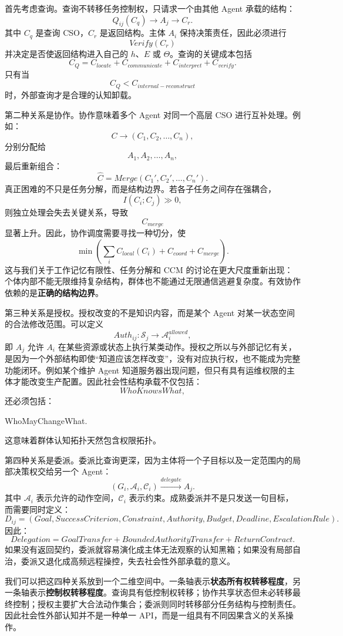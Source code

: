 首先考虑查询。查询不转移任务控制权，只请求一个由其他 Agent 承载的结构：
\[
Q_{ij}(C_q)
\rightarrow
A_j
\rightarrow
C_r.
\]
其中 $C_q$ 是查询 CSO，$C_r$ 是返回结构。主体 $A_i$ 保持决策责任，因此必须进行
\[
Verify(C_r)
\]
并决定是否使返回结构进入自己的 $h$、$E$ 或 $\Theta$。查询的关键成本包括
\[
C_Q
=
C_{locate}
+
C_{communicate}
+
C_{interpret}
+
C_{verify}.
\]
只有当
\[
C_Q<C_{internal-reconstruct}
\]
时，外部查询才是合理的认知卸载。

第二种关系是协作。协作意味着多个 Agent 对同一个高层 CSO 进行互补处理。例如：
\[
C
\rightarrow
(C_1,C_2,\ldots,C_n),
\]
分别分配给
\[
A_1,A_2,\ldots,A_n,
\]
最后重新组合：
\[
\hat C
=
Merge(C_1',C_2',\ldots,C_n').
\]
真正困难的不只是任务分解，而是结构边界。若各子任务之间存在强耦合，
\[
I(C_i;C_j)\gg0,
\]
则独立处理会失去关键关系，导致
\[
C_{merge}
\]
显著上升。因此，协作调度需要寻找一种切分，使
\[
\min
\left(
\sum_i C_{local}(C_i)
+
C_{coord}
+
C_{merge}
\right).
\]
这与我们关于工作记忆有限性、任务分解和 CCM 的讨论在更大尺度重新出现：个体内部不能无限维持复杂结构，群体也不能通过无限通信逃避复杂度。有效协作依赖的是\textbf{正确的结构边界}。

第三种关系是授权。授权改变的不是知识内容，而是某个 Agent 对某一状态空间的合法修改范围。可以定义
\[
Auth_{ij}
:
\mathcal S_j
\rightarrow
\mathcal A_i^{allowed},
\]
即 $A_j$ 允许 $A_i$ 在某些资源或状态上执行某类动作。授权之所以与外部记忆有关，是因为一个外部结构即使``知道应该怎样改变''，没有对应执行权，也不能成为完整功能闭环。例如某个维护 Agent 知道服务器出现问题，但只有具有运维权限的主体才能改变生产配置。因此社会性结构承载不仅包括：
\[
WhoKnowsWhat,
\]
还必须包括：
\begin{statementbox}
WhoMayChangeWhat.
\end{statementbox}
这意味着群体认知拓扑天然包含权限拓扑。

第四种关系是委派。委派比查询更深，因为主体将一个子目标以及一定范围内的局部决策权交给另一个 Agent：
\[
(G_i,\mathcal A_i,\mathcal C_i)
\xrightarrow{delegate}
A_j.
\]
其中 $\mathcal A_i$ 表示允许的动作空间，$\mathcal C_i$ 表示约束。成熟委派并不是只发送一句目标，而需要同时定义：
\[
D_{ij}
=
(
Goal,
SuccessCriterion,
Constraint,
Authority,
Budget,
Deadline,
EscalationRule
).
\]
因此：
\[
\boxed{
Delegation
=
GoalTransfer
+
BoundedAuthorityTransfer
+
ReturnContract.
}
\]
如果没有返回契约，委派就容易演化成主体无法观察的认知黑箱；如果没有局部自治，委派又退化成高频远程操控，失去社会性外部承载的意义。

我们可以把这四种关系放到一个二维空间中。一条轴表示\textbf{状态所有权转移程度}，另一条轴表示\textbf{控制权转移程度}。查询具有低控制权转移；协作共享状态但未必转移最终控制；授权主要扩大合法动作集合；委派则同时转移部分任务结构与控制责任。因此社会性外部认知并不是一种单一 API，而是一组具有不同因果含义的关系操作。

